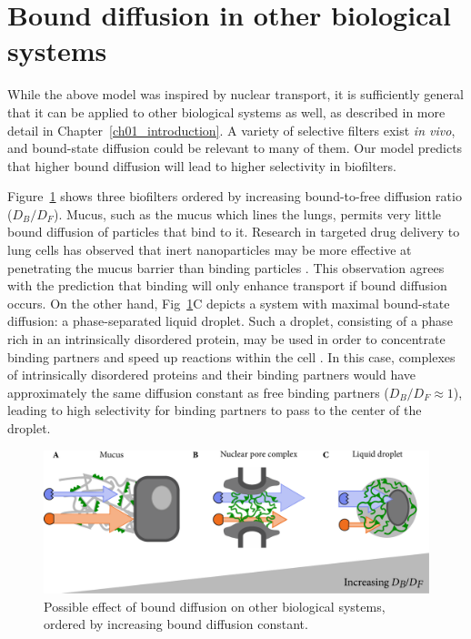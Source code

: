 \section{Bound diffusion in other biological systems}
\label{sec:other-filters}

While the above model was inspired by nuclear transport, it is sufficiently general that it can be applied to other biological systems as well, as described in more detail in Chapter~\ref{ch01_introduction}.  A variety of selective filters exist \textit{in vivo}, and bound-state diffusion could be relevant to many of them.  Our model predicts that higher bound diffusion will lead to higher selectivity in biofilters.  

Figure~\ref{fig:other-filters} shows three biofilters ordered by increasing bound-to-free diffusion ratio ($D_B/D_F$).  Mucus, such as the mucus which lines the lungs, permits very little bound diffusion of particles that bind to it.  Research in targeted drug delivery to lung cells has observed that inert nanoparticles may be more effective at penetrating the mucus barrier than binding particles \cite{witten17}.  This observation agrees with the prediction that binding will only enhance transport if bound diffusion occurs.   On the other hand, Fig~\ref{fig:other-filters}C depicts a system with maximal bound-state diffusion: a phase-separated liquid droplet.  Such a droplet, consisting of a phase rich in an intrinsically disordered protein, may be used in order to concentrate binding partners and speed up reactions within the cell \cite{brangwynne15, feric16}.  In this case, complexes of intrinsically disordered proteins and their binding partners would have approximately the same diffusion constant as free binding partners ($D_B/D_F \approx 1$), leading to high selectivity for binding partners to pass to the center of the droplet.

\begin{figure}[t!]
\centering
\includegraphics[width=0.8\linewidth]{figs/ch02/concluding-cartoon-large.pdf}
\caption[Bound diffusion in other systems.]{Possible effect of bound diffusion on other biological systems, ordered by increasing bound diffusion constant.}
\label{fig:other-filters}
\end{figure}

